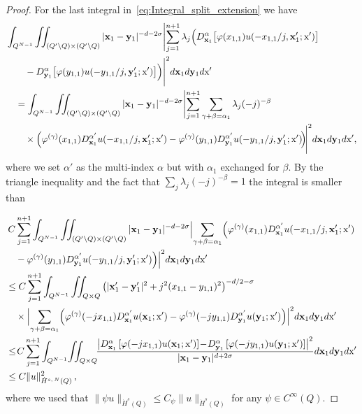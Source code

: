 \documentclass[10pt]{amsart}
\theoremstyle{definition}\newtheorem{defi}[theo]{Definition}\newtheorem{rema}[theo]{Remark}\newtheorem{exam}[theo]{Example}\newtheorem{exem}[theo]{Example}\newtheorem{nota}[theo]{Notation}
\newcommand\1{{\ensuremath {\mathds 1} }}
\newcommand{\bx}{\mathbf{x}}
\newcommand{\by}{\mathbf{y}}
\newcommand{\sx}{\textup{x}}
\begin{document}
\begin{proof}
For the last integral in~\eqref{eq:Integral_split_extension} we have
\begin{align*}
&\int_{Q^{N-1}}
\iint_{(Q'\setminus Q)\times (Q'\setminus Q)} |\bx_1-\by_1|^{-d-2\sigma}\Biggl|\sum_{j=1}^{n+1}\lambda_j \Bigl(D^\alpha_{\bx_1} \bigl[\varphi(x_{1,1}) u(-x_{1,1}/j, \bx_1';\sx')\bigr]\\
&\qquad -D^\alpha_{\by_1} \bigl[\varphi(y_{1,1}) u(-y_{1,1}/j, \by_1';\sx')\bigr]\Bigr)\Biggr|^2 d\bx_1 d\by_1 d\sx'\\
&\quad=
\int_{Q^{N-1}}\iint_{(Q'\setminus Q)\times (Q'\setminus Q)} |\bx_1-\by_1|^{-d-2\sigma}
\Biggl|\sum_{j=1}^{n+1}\sum_{\gamma+\beta=\alpha_1}\lambda_j(-j)^{-\beta}\\
&\qquad \times \Bigl(\varphi^{(\gamma)}(x_{1,1}) D_{\bx_1}^{\alpha'}u(-x_{1,1}/j, \bx_1';\sx') -\varphi^{(\gamma)}(y_{1,1}) D_{\by_1}^{\alpha'}u(-y_{1,1}/j, \by_1';\sx')\!\Bigr)\!\Biggr|^2 d\bx_1 d\by_1 d\sx',
\end{align*}
where we set $\alpha'$ as the multi-index $\alpha$ but with $\alpha_1$ exchanged for $\beta$. By the triangle inequality and the fact that $\sum_{j}\lambda_j(-j)^{-\beta}=1$ the integral is smaller than


\begin{multline*}
C\sum_{j=1}^{n+1}\int_{Q^{N-1}}\iint_{(Q'\setminus Q)\times (Q'\setminus Q)} |\bx_1-\by_1|^{-d-2\sigma}\Bigl|\sum_{\gamma+\beta=\alpha_1}\Bigl(\varphi^{(\gamma)}(x_{1,1}) D_{\bx_1}^{\alpha'}u(-x_{1,1}/j, \bx_1';\sx')\\
\begin{aligned}
&\quad -\varphi^{(\gamma)}(y_{1,1}) D_{\by_1}^{\alpha'}u(-y_{1,1}/j, \by_1';\sx')\Bigr)\Bigr|^2 d\bx_1 d\by_1 d\sx'\\
&\leq C\sum_{j=1}^{n+1}\int_{Q^{N-1}}\iint_{Q\times Q} \left(|\bx_1'-\by_1'|^2+j^2(x_{1,1}-y_{1,1})^2\right)^{-d/2-\sigma}\\
&\quad \times
\Bigl|\sum_{\gamma+\beta=\alpha_1}\Bigl(\varphi^{(\gamma)}(-j x_{1,1}) D_{\bx_1}^{\alpha'}u(\bx_1; \sx') -\varphi^{(\gamma)}(- j y_{1,1}) D_{\by_1}^{\alpha'}u(\by_1; \sx')\Bigr)\Bigr|^2 d\bx_1 d\by_1 d\sx'\\
&\leq\!C\sum_{j=1}^{n+1}\int_{Q^{N-1}}\!\iint_{Q\times Q}\!\! \frac{\left|D^\alpha_{\bx_1}\left[\varphi(-j x_{1,1})u(\bx_1; \sx')\right]\!-\!D^\alpha_{\by_1}\left[\varphi(- j y_{1,1}) u(\by_1; \sx')\right]\right|^2}{|\bx_1-\by_1|^{d+2\sigma}} d\bx_1 d\by_1 d\sx'\\
& \leq C \|u\|_{\dot{H}^{s,\,N}(Q)}^2\,,
\end{aligned}
\end{multline*}
where we used that $\|\psi u\|_{\dot{H}^s(Q)}\leq C_\psi \|u\|_{\dot{H}^s(Q)}$ for any $\psi\in C^\infty(Q).$
\goodbreak



\end{proof}
\end{document}
